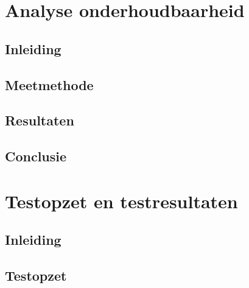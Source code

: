 \documentclass[11pt, a4paper]{report}
\begin{document}
\tableofcontents
\clearpage


\chapter{Analyse onderhoudbaarheid}

\section{Inleiding}

\section{Meetmethode}

\section{Resultaten}

\section{Conclusie}


\chapter{Testopzet en testresultaten}

\section{Inleiding}

\section{Testopzet}
\end{document}
